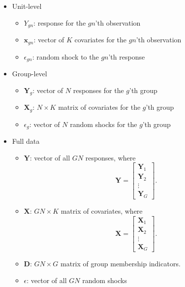 \documentclass[12pt,oneside,openany]{book}
\providecommand{\tightlist}{%
  \setlength{\itemsep}{0pt}\setlength{\parskip}{0pt}}
\begin{document}
\begin{itemize}
\tightlist
\item
  Unit-level

  \begin{itemize}
  \tightlist
  \item
    \(Y_{gn}\): response for the \(gn\)'th observation
  \item
    \(\mathbf{x}_{gn}\): vector of \(K\) covariates for the \(gn\)'th
    observation
  \item
    \(\epsilon_{gn}\): random shock to the \(gn\)'th response
  \end{itemize}
\item
  Group-level

  \begin{itemize}
  \tightlist
  \item
    \(\mathbf{Y}_g\): vector of \(N\) responses for the \(g\)'th group
  \item
    \(\mathbf{X}_g\): \(N \times K\) matrix of covariates for the
    \(g\)'th group
  \item
    \(\epsilon_g\): vector of \(N\) random shocks for the \(g\)'th group
  \end{itemize}
\item
  Full data

  \begin{itemize}
  \tightlist
  \item
    \(\mathbf{Y}\): vector of all \(GN\) responses, where
    \[\mathbf{Y} = \begin{bmatrix} \mathbf{Y}_1 \\ \mathbf{Y}_2 \\ \vdots \\ \mathbf{Y}_G \end{bmatrix}.\]
  \item
    \(\mathbf{X}\): \(GN \times K\) matrix of covariates, where
    \[\mathbf{X} = \begin{bmatrix} \mathbf{X}_1 \\ \mathbf{X}_2 \\ \vdots \\ \mathbf{X}_G \end{bmatrix}.\]
  \item
    \(\mathbf{D}\): \(GN \times G\) matrix of group membership
    indicators.
  \item
    \(\epsilon\): vector of all \(GN\) random shocks
  \end{itemize}
\end{itemize}
\end{document}
